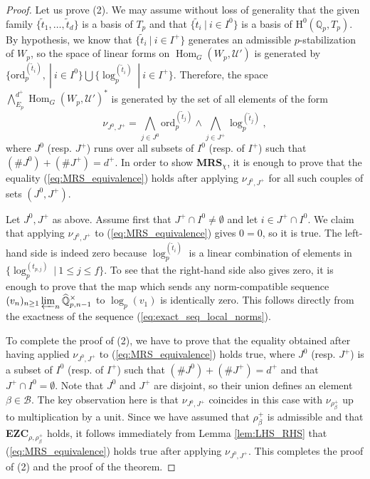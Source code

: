 \documentclass[12pt]{amsart}
\newcommand\bQ{\mathbb{Q}}
\newcommand\Qp{{\mathbb{Q}_p}}
\newcommand\cB{\mathcal{B}}
\newcommand\cU{\mathcal{U}}
\newcommand{\ord}{\mathrm{ord}}
\DeclareMathOperator{\Hom}{Hom}
\newcommand{\HH}{\mathrm{H}}
\theoremstyle{defstyle}
\theoremstyle{thmstyle}
\begin{document}
\begin{proof}
	 Let us prove (2). We may assume without loss of generality that the given family $\{\widetilde{t}_1,\ldots,\widetilde{t}_d\}$ is a basis of $T_p$ and that $\{\widetilde{t}_i\ |\ i\in I^0\}$ is a basis of $\HH^0(\Qp,T_p)$. By hypothesis, we know that $\{\widetilde{t}_i\ |\ i\in I^+\}$ generates an admissible $p$-stabilization of $W_p$, so the space of linear forms on $\Hom_G(W_p,\cU')$ is generated by $\{\ord_p^{(\widetilde{t}_i)}, \ |\ i\in I^0\}\bigcup\{\log_p^{(\widetilde{t}_i)}\ |\ i\in I^+\}$. Therefore, the space $\bigwedge^{d^+}_{E_p}\Hom_G(W_p,\cU')^*$ is generated by the set of all elements of the form $$\nu_{J^0,J^+}=\bigwedge_{j\in J^0}\ord_p^{(\widetilde{t}_j)}\wedge \bigwedge_{j\in J^+} \log_p^{(\widetilde{t}_{j})},$$
	 where $J^0$ (resp. $J^+$) runs over all subsets of $I^0$ (resp. of $I^+$) such that $(\#J^0)+(\#J^+)=d^+$. In order to show \textbf{MRS}$_\chi$, it is enough to prove that the equality (\ref{eq:MRS_equivalence}) holds after applying $\nu_{J^0,J^+}$ for all such couples of sets $(J^0,J^+)$. 
	 
	 Let $J^0,J^+$ as above. Assume first that $J^+\cap I^0\neq\emptyset$ and let $i\in J^+ \cap I^0$. We claim that applying $\nu_{J^0,J^+}$ to (\ref{eq:MRS_equivalence}) gives $0=0$, so it is true. The left-hand side is indeed zero because $\log_p^{(\widetilde{t}_i)}$ is a linear combination of elements in $\{\log_p^{(t_{p,j})}\ |\ 1\leq j \leq f \}$. To see that the right-hand side also gives zero, it is enough to prove that the map which sends any norm-compatible sequence $(v_n)_{n\geq 1} \varprojlim_n \widehat{\bQ}^\times_{p,n-1}$ to $\log_p(v_1)$ is identically zero. This follows directly from the exactness of the sequence (\ref{eq:exact_seq_local_norms}). 
	 
	 To complete the proof of (2), we have to prove that the equality obtained after having applied $\nu_{J^0,J^+}$ to (\ref{eq:MRS_equivalence}) holds true, where $J^0$ (resp. $J^+$) is a subset of $I^0$ (resp. of $I^+$) such that $(\#J^0)+(\#J^+)=d^+$ and that $J^+\cap I^0=\emptyset$. Note that $J^0$ and $J^+$ are disjoint, so their union defines an element $\beta\in\cB$. The key observation here is that $\nu_{J^0,J^+}$ coincides in this case with $\nu_{\rho_\beta^+}$ up to multiplication by a unit. Since we have assumed that $\rho^+_\beta$ is admissible and that \textbf{EZC}$_{\rho,\rho^+_\beta}$ holds, it follows immediately from Lemma \ref{lem:LHS_RHS} that (\ref{eq:MRS_equivalence}) holds true after applying $\nu_{J^0,J^+}$. This completes the proof of (2) and the proof of the theorem.
\end{proof}
\end{document}
